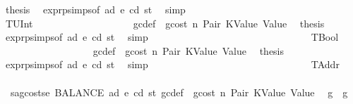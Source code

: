 \begin{isabellebody}
\ {\isacharquery}{\kern0pt}thesis\ \isamarkupfalse%
\ expr{\isachardot}{\kern0pt}psimps{\isacharparenleft}{\kern0pt}{}{\isacharparenright}{\kern0pt}{\isacharbrackleft}{\kern0pt}of\ ad\ e\ cd\ st{\isacharbrackright}{\kern0pt}\ \isamarkupfalse%
\ simp\isanewline
\ \ \ \ \ \ \ \ \ \ \ \ \ \ \isamarkupfalse%
\isanewline
\ \ \ \ \ \ \ \ \ \ \ \ \ \ \ \ \isamarkupfalse%
\ {\isacharparenleft}{\kern0pt}TUInt\ {\isacharunderscore}{\kern0pt}{\isacharparenright}{\kern0pt}\isanewline
\ \ \ \ \ \ \ \ \ \ \ \ \ \ \ \ \isamarkupfalse%
\ {}{}\ gc{\isacharunderscore}{\kern0pt}def\ {\isacharasterisk}{\kern0pt}\ gcost\ n\ Pair\ KValue\ Value\ \isamarkupfalse%
\ {\isacharquery}{\kern0pt}thesis\ \isamarkupfalse%
\ expr{\isachardot}{\kern0pt}psimps{\isacharparenleft}{\kern0pt}{}{\isacharparenright}{\kern0pt}{\isacharbrackleft}{\kern0pt}of\ ad\ e\ cd\ st{\isacharbrackright}{\kern0pt}\ \isamarkupfalse%
\ simp\isanewline
\ \ \ \ \ \ \ \ \ \ \ \ \ \ \isamarkupfalse%
\isanewline
\ \ \ \ \ \ \ \ \ \ \ \ \ \ \ \ \isamarkupfalse%
\ TBool\isanewline
\ \ \ \ \ \ \ \ \ \ \ \ \ \ \ \ \isamarkupfalse%
\ {}{}\ gc{\isacharunderscore}{\kern0pt}def\ {\isacharasterisk}{\kern0pt}\ gcost\ n\ Pair\ KValue\ Value\ \isamarkupfalse%
\ {\isacharquery}{\kern0pt}thesis\ \isamarkupfalse%
\ expr{\isachardot}{\kern0pt}psimps{\isacharparenleft}{\kern0pt}{}{\isacharparenright}{\kern0pt}{\isacharbrackleft}{\kern0pt}of\ ad\ e\ cd\ st{\isacharbrackright}{\kern0pt}\ \isamarkupfalse%
\ simp\isanewline
\ \ \ \ \ \ \ \ \ \ \ \ \ \ \isamarkupfalse%
\isanewline
\ \ \ \ \ \ \ \ \ \ \ \ \ \ \ \ \isamarkupfalse%
\ TAddr\isanewline
\ \ \ \ \ \ \ \ \ \ \ \ \ \ \ \ \isamarkupfalse%
\ {}{}{\isacharparenleft}{\kern0pt}{}{\isacharparenright}{\kern0pt}{\isacharbrackleft}{\kern0pt}\ {\isacharquery}{\kern0pt}s{\isacharprime}{\kern0pt}a{\isacharequal}{\kern0pt}{\isachardoublequoteopen}g{\isacharminus}{\kern0pt}costs\isactrlsub e\ {\isacharparenleft}{\kern0pt}BALANCE\ ad{\isacharparenright}{\kern0pt}\ e\ cd\ st{\isachardoublequoteclose}{\isacharbrackright}{\kern0pt}\ gc{\isacharunderscore}{\kern0pt}def\ {\isacharasterisk}{\kern0pt}\ gcost\ n\ Pair\ KValue\ Value\ \isamarkupfalse%
\ {\isachardoublequoteopen}g{}\ {\isasymle}\ g{\isachardoublequoteclose}\ \isamarkupfalse%

\end{isabellebody}
